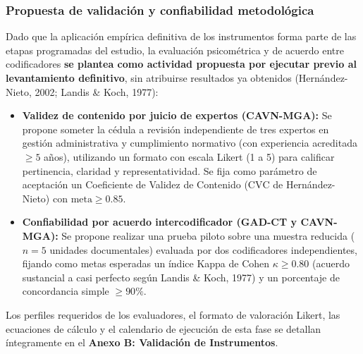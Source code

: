 {\subsubsection{Propuesta de validación y confiabilidad metodológica}
Dado que la aplicación empírica definitiva de los instrumentos forma parte de las etapas programadas del estudio, la evaluación psicométrica y de acuerdo entre codificadores \textbf{se plantea como actividad propuesta por ejecutar previo al levantamiento definitivo}, sin atribuirse resultados ya obtenidos (Hernández-Nieto, 2002; Landis \& Koch, 1977):
\begin{itemize}
    \item \textbf{Validez de contenido por juicio de expertos (CAVN-MGA):} Se propone someter la cédula a revisión independiente de tres expertos en gestión administrativa y cumplimiento normativo (con experiencia acreditada $\ge 5$ años), utilizando un formato con escala Likert (1 a 5) para calificar pertinencia, claridad y representatividad. Se fija como parámetro de aceptación un Coeficiente de Validez de Contenido ($\text{CVC}$ de Hernández-Nieto) con $\text{meta} \ge 0.85$.
    \item \textbf{Confiabilidad por acuerdo intercodificador (GAD-CT y CAVN-MGA):} Se propone realizar una prueba piloto sobre una muestra reducida ($n = 5$ unidades documentales) evaluada por dos codificadores independientes, fijando como metas esperadas un índice Kappa de Cohen $\kappa \ge 0.80$ (acuerdo sustancial a casi perfecto según Landis \& Koch, 1977) y un porcentaje de concordancia simple $\ge 90\%$.
\end{itemize}
Los perfiles requeridos de los evaluadores, el formato de valoración Likert, las ecuaciones de cálculo y el calendario de ejecución de esta fase se detallan íntegramente en el \textbf{Anexo B: Validación de Instrumentos}.

}
